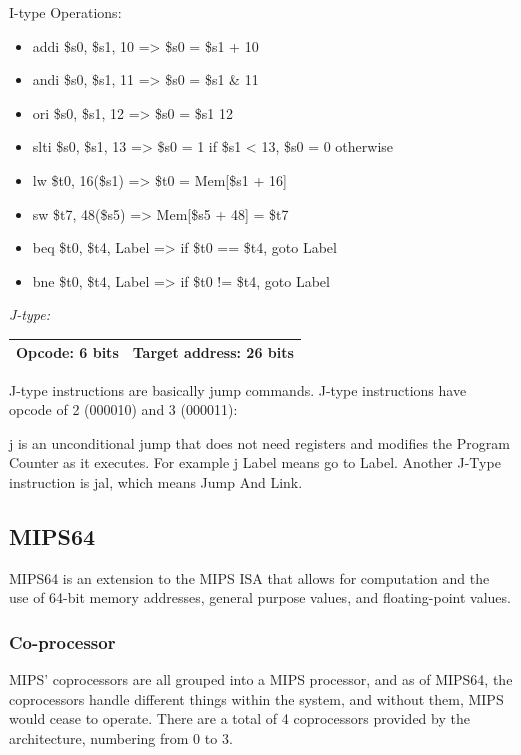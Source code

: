 \documentclass[parskip=half, fontsize=12pt]{scrartcl}
\providecommand{\tightlist}{%
  \setlength{\itemsep}{0pt}\setlength{\parskip}{0pt}}
\begin{document}
I-type Operations:

\begin{itemize}
    \tightlist
    \item addi \$s0, \$s1, 10 =\textgreater{} \$s0 = \$s1 + 10
    \item andi \$s0, \$s1, 11 =\textgreater{} \$s0 = \$s1 \& 11
    \item ori \$s0, \$s1, 12 =\textgreater{} \$s0 = \$s1 \textbar{} 12
    \item slti \$s0, \$s1, 13 =\textgreater{} \$s0 = 1 if \$s1 \textless{} 13, \$s0 = 0 otherwise
    \item lw \$t0, 16(\$s1) =\textgreater{} \$t0 = Mem{[}\$s1 + 16{]}
    \item sw \$t7, 48(\$s5) =\textgreater{} Mem{[}\$s5 + 48{]} = \$t7
    \item beq \$t0, \$t4, Label =\textgreater{} if \$t0 == \$t4, goto Label
    \item bne \$t0, \$t4, Label =\textgreater{} if \$t0 != \$t4, goto Label
\end{itemize}

\emph{J-type:}

\begin{tabularx}{\textwidth}{@{}|c|C|@{}}
    \hline
    Opcode: 6 bits & Target address: 26 bits \\
    \hline
\end{tabularx}

J-type instructions are basically jump commands. J-type instructions
have opcode of 2 (000010) and 3 (000011):

j is an unconditional jump that does not need registers and modifies the
Program Counter as it executes. For example j Label means go to Label.
Another J-Type instruction is jal, which means Jump And Link.

\subsection{MIPS64}
\label{sec:mips64}

MIPS64 is an extension to the MIPS ISA that allows for computation and
the use of 64-bit memory addresses, general purpose values, and
floating-point values.

\subsubsection{Co-processor}

MIPS' coprocessors are all grouped into a MIPS processor, and as of
MIPS64, the coprocessors handle different things within the system, and
without them, MIPS would cease to operate. There are a total of 4
coprocessors provided by the architecture, numbering from 0 to 3.
\end{document}
